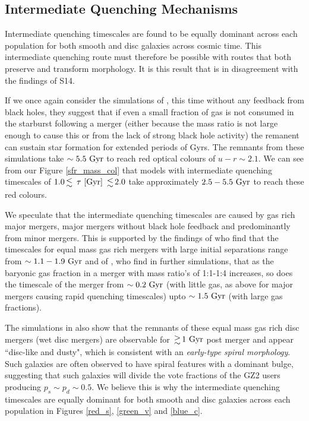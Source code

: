 \documentclass[useAMS,usenatbib]{mn2e}
\def\changed    {\color{titlecol} }
\begin{document}
\subsection{Intermediate Quenching Mechanisms}
{\changed Intermediate quenching timescales are found to be equally dominant across each population for both smooth and disc galaxies across cosmic time.} This intermediate quenching route must therefore be possible with routes that both preserve and transform morphology. It is this result that is in disagreement with the findings of S14. 

If we once again consider the simulations of \citet{Springel05}, this time without any feedback from black holes, they suggest that if even a small fraction of gas is not consumed in the starburst following a merger (either because the mass ratio is not large enough to cause this or from the lack of strong black hole activity) the remanent can sustain star formation for extended periods of Gyrs. The remnants from these simulations take $\sim5.5~\rm{Gyr}$ to reach red optical colours of $u-r \sim 2.1$. We can see from our Figure \ref{sfr_mass_col} that models with intermediate quenching timescales of $1.0 \la ~\tau~\rm{[Gyr]} ~\la 2.0$ take approximately $2.5-5.5~\rm{Gyr}$ to reach these red colours.

We speculate that the intermediate quenching timescales are caused by gas rich major mergers, major mergers without black hole feedback and predominantly from minor mergers. This is supported by the findings of \citet{Lotz08}  who find that the timescales for equal mass gas rich mergers with large initial separations range from $\sim 1.1-1.9~\rm{Gyr}$ and of \citet{Lotz11}, who find in further simulations, that as the baryonic gas fraction in a merger with mass ratio's of 1:1-1:4 increases, so does the timescale of the merger from $\sim0.2~\rm{Gyr}$ (with little gas, as above for major mergers causing rapid quenching timescales) upto $\sim1.5~\rm{Gyr}$ (with large gas fractions). 

The simulations in \citet{Lotz08} also show that the remnants of these equal mass gas rich disc mergers (wet disc mergers) are observable for $\ga1~\rm{Gyr}$ post merger and appear ``disc-like and dusty", which is consistent with an \emph{early-type spiral morphology}.  Such galaxies are often observed to have spiral features with a dominant bulge, suggesting that such galaxies will divide the vote fractions of the GZ2 users producing $p_s \sim p_d \sim 0.5$. We believe this is why the intermediate quenching timescales are equally dominant for both smooth and disc galaxies across each population in Figures \ref{red_s}, \ref{green_v} and \ref{blue_c}. 
\end{document}
